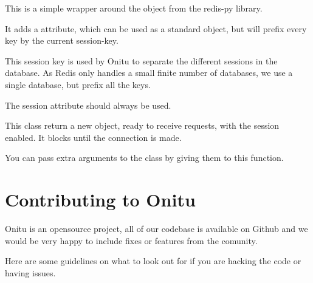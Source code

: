 \documentclass[letterpaper,10pt,english]{sphinxmanual}
\begin{document}
\begin{fulllineitems}
\label{components:onitu.utils.Redis}
This is a simple wrapper around the  object
from the redis-py library.

It adds a  attribute, which can be used as a
standard  object, but will prefix every key
by the current session-key.

This session key is used by Onitu to separate the different
sessions in the database. As Redis only handles a small finite
number of databases, we use a single database, but prefix all the
keys.

The session attribute should always be used.

\end{fulllineitems}


\begin{fulllineitems}
\label{components:onitu.utils.connect_to_redis}
This class return a new {\hyperref[components:onitu.utils.Redis]{}} object, ready to
receive requests, with the session enabled.
It blocks until the connection is made.

You can pass extra arguments to the {\hyperref[components:onitu.utils.Redis]{}} class by
giving them to this function.

\end{fulllineitems}



\section{Contributing to Onitu}
\label{contribute:contributing-to-onitu}\label{contribute::doc}
Onitu is an opensource project, all of our codebase is available on Github and we would be very happy to include fixes or features from the comunity.

Here are some guidelines on what to look out for if you are hacking the code or having issues.
\end{document}
